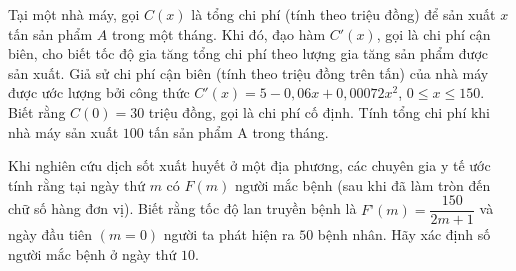 \begin{bt}%
	Tại một nhà máy, gọi $C(x)$ là tổng chi phí (tính theo triệu đồng) để  sản xuất $x$ tấn sản phẩm $A$ trong một tháng. Khi đó, đạo hàm $C'(x)$, gọi là chi phí cận biên, cho biết tốc độ gia tăng tổng chi phí theo lượng gia tăng sản phẩm được sản xuất. Giả sử chi phí cận biên (tính theo triệu đồng trên tấn) của nhà máy được ước lượng bởi công thức
	$C'(x)=5-0{,}06 x+0{,}00072 x^2$, $0 \le  x \le 150$.
	Biết rằng $C(0)=30$ triệu đồng, gọi là chi phí cố định. Tính tổng chi phí khi nhà máy sản xuất $100$ tấn sản phẩm A trong  tháng.
\end{bt}

\begin{bt}%
	Khi nghiên cứu dịch sốt xuất huyết ở một địa phương, các chuyên gia y tế ước tính rằng tại ngày thứ $m$ có $F(m)$ người mắc bệnh (sau khi đã làm tròn đến chữ số hàng đơn vị). Biết rằng tốc độ lan truyền bệnh là $F’(m)=\dfrac{150}{2 m+1}$ và ngày đầu tiên $(m=0)$ người ta phát hiện ra $50$ bệnh nhân. Hãy  xác định số người mắc bệnh ở ngày thứ $10$.
\end{bt}

